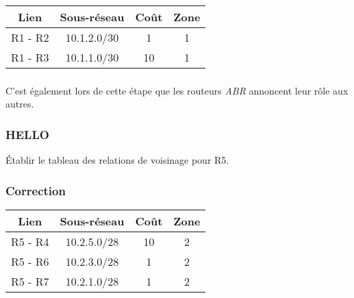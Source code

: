 \documentclass[svgnames,11pt]{beamer}
\begin{document}
\begin{frame}
    \frametitle{}

    \begin{center}
        \begin{tabular}{|*{4}{c|}}
            \hline
            Lien    & Sous-réseau & Coût & Zone \\
            \hline
            R1 - R2 & 10.1.2.0/30 & 1    & 1    \\
            \hline
            R1 - R3 & 10.1.1.0/30 & 10   & 1    \\
            \hline
        \end{tabular}
    \end{center}    

\end{frame}
\begin{frame}
    \frametitle{}

    \begin{aretenir}[Remarque]
        C'est également lors de cette étape que les routeurs \emph{ABR} annoncent leur rôle aux autres.
    \end{aretenir}

\end{frame}
\begin{frame}
    \frametitle{HELLO}

    \begin{activite}
        Établir le tableau des relations de voisinage pour R5.
    \end{activite}


\end{frame}

\begin{frame}
    \frametitle{Correction}

    \begin{center}
        \begin{tabular}{|*{4}{c|}}
            \hline
            Lien    & Sous-réseau & Coût & Zone \\
            \hline
            R5 - R4 & 10.2.5.0/28 & 10   & 2    \\
            \hline
            R5 - R6 & 10.2.3.0/28 & 1    & 2    \\
            \hline
            R5 - R7 & 10.2.1.0/28 & 1    & 2    \\
            \hline
        \end{tabular}
    \end{center}

\end{frame}
\end{document}
